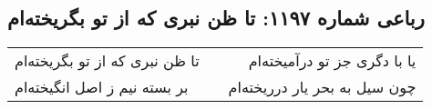 \begin{center}
\section*{رباعی شماره ۱۱۹۷: تا ظن نبری که از تو بگریخته‌ام}
\label{sec:1197}
\begin{longtable}{l p{0.5cm} r}
تا ظن نبری که از تو بگریخته‌ام
&&
یا با دگری جز تو درآمیخته‌ام
\\
بر بسته نیم ز اصل انگیخته‌ام
&&
چون سیل به بحر یار درریخته‌ام
\\
\end{longtable}
\end{center}
